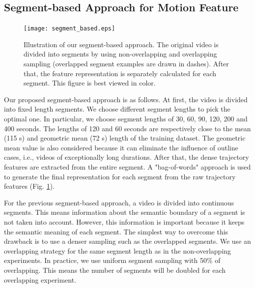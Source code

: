 \subsection{Segment-based Approach for Motion Feature}
\label{subsec:4}
\begin{figure}
	\centering
	\texttt{[image: segment\_based.eps]}
	\caption{Illustration of our segment-based approach. The original video is divided into segments by using non-overlapping and overlapping sampling (overlapped segment examples are drawn in dashes). After that, the feature representation is separately calculated for each segment. This figure is best viewed in color.}
	\label{segmentbased}
\end{figure}

Our proposed segment-based approach is as follows. At first, the video is divided into fixed length segments. We choose different segment lengths to pick the optimal one. In particular, we choose segment lengths of 30, 60, 90, 120, 200 and 400 seconds. The lengths of 120 and 60 seconds are respectively close to the mean (115 s) and geometric mean (72 s) length of the training dataset. The geometric mean value is also considered because it can eliminate the influence of outline cases, i.e., videos of exceptionally long durations. After that, the dense trajectory features are extracted from the entire segment. A "bag-of-words" approach is used to generate the final representation for each segment from the raw trajectory features (Fig. \ref{segmentbased}).

For the previous segment-based approach, a video is divided into continuous segments. This means information about the semantic boundary of a segment is not taken into account. However, this information is important because it keeps the semantic meaning of each segment. The simplest way to overcome this drawback is to use a denser sampling such as the overlapped segments. We use an overlapping strategy for the same segment length as in the non-overlapping experiments. In practice, we use uniform segment sampling with 50\% of overlapping. This means the number of segments will be doubled for each overlapping experiment.

